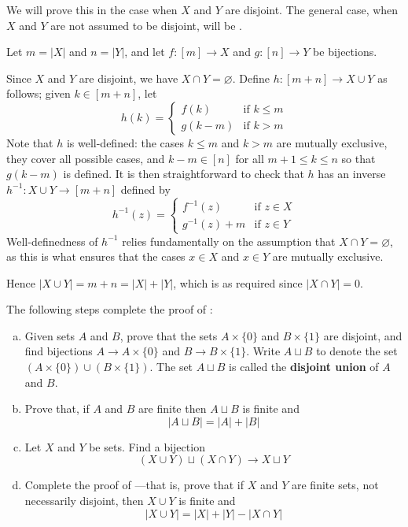 \begin{cproof}
We will prove this in the case when $X$ and $Y$ are disjoint. The general case, when $X$ and $Y$ are not assumed to be disjoint, will be .

Let $m = |X|$ and $n=|Y|$, and let $f : [m] \to X$ and $g : [n] \to Y$ be bijections.

Since $X$ and $Y$ are disjoint, we have $X \cap Y = \varnothing$. Define $h : [m+n] \to X \cup Y$ as follows; given $k \in [m+n]$, let
\[ h(k) = \begin{cases} f(k) & \text{if } k \le m \\ g(k-m) & \text{if } k > m \end{cases} \]
Note that $h$ is well-defined: the cases $k \le m$ and $k > m$ are mutually exclusive, they cover all possible cases, and $k-m \in [n]$ for all $m+1 \le k \le n$ so that $g(k-m)$ is defined. It is then straightforward to check that $h$ has an inverse $h^{-1} : X \cup Y \to [m+n]$ defined by
\[ h^{-1}(z) = \begin{cases} f^{-1}(z) & \text{if } z \in X \\ g^{-1}(z)+m & \text{if } z \in Y \end{cases} \]
Well-definedness of $h^{-1}$ relies fundamentally on the assumption that $X \cap Y = \varnothing$, as this is what ensures that the cases $x \in X$ and $x \in Y$ are mutually exclusive.

Hence $|X \cup Y| = m+n = |X| + |Y|$, which is as required since $|X \cap Y| = 0$.
\end{cproof}

\begin{exercise}
\label{exSizeOfUnion}
The following steps complete the proof of :
\begin{enumerate}[(a)]
\item Given sets $A$ and $B$, prove that the sets $A \times \{ 0 \}$ and $B \times \{ 1 \}$ are disjoint, and find bijections $A \to A \times \{ 0 \}$ and $B \to B \times \{ 1 \}$. Write $A \sqcup B$  to denote the set $(A \times \{ 0 \}) \cup (B \times \{ 1 \})$. The set $A \sqcup B$ is called the \textbf{disjoint union} of $A$ and $B$.
\item Prove that, if $A$ and $B$ are finite then $A \sqcup B$ is finite and
\[ |A \sqcup B| = |A| + |B| \]
\item Let $X$ and $Y$ be sets. Find a bijection
\[ (X \cup Y) \sqcup (X \cap Y) \to X \sqcup Y \]
\item Complete the proof of ---that is, prove that if $X$ and $Y$ are finite sets, not necessarily disjoint, then $X \cup Y$ is finite and
\[ |X \cup Y| = |X| + |Y| - |X \cap Y| \]
\end{enumerate}
\end{exercise}

